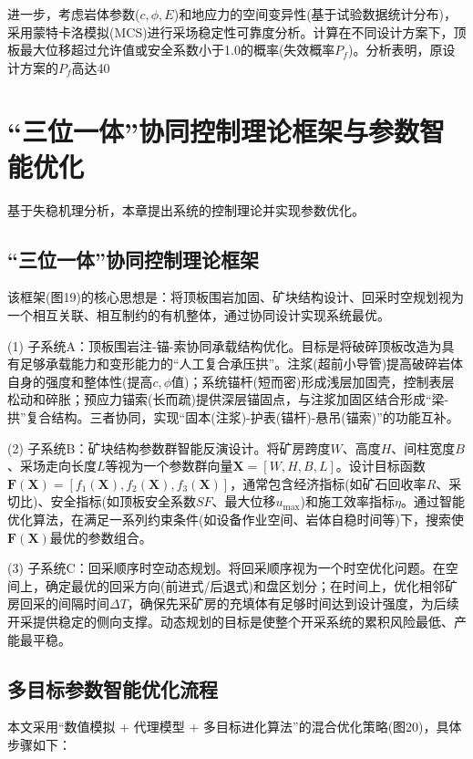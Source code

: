\documentclass[twocolumn,a4paper,10pt]{article}
\begin{document}
进一步，考虑岩体参数($c, \phi, E$)和地应力的空间变异性(基于试验数据统计分布)，采用蒙特卡洛模拟(MCS)进行采场稳定性可靠度分析。计算在不同设计方案下，顶板最大位移超过允许值或安全系数小于1.0的概率(失效概率$P_f$)。分析表明，原设计方案的$P_f$高达40%

\section{“三位一体”协同控制理论框架与参数智能优化}
基于失稳机理分析，本章提出系统的控制理论并实现参数优化。

\subsection{“三位一体”协同控制理论框架}
该框架(图19)的核心思想是：将顶板围岩加固、矿块结构设计、回采时空规划视为一个相互关联、相互制约的有机整体，通过协同设计实现系统最优。

(1) 子系统A：顶板围岩注-锚-索协同承载结构优化。目标是将破碎顶板改造为具有足够承载能力和变形能力的“人工复合承压拱”。注浆(超前小导管)提高破碎岩体自身的强度和整体性(提高$c, \phi$值)；系统锚杆(短而密)形成浅层加固壳，控制表层松动和碎胀；预应力锚索(长而疏)提供深层锚固点，与注浆加固区结合形成“梁-拱”复合结构。三者协同，实现“固本(注浆)-护表(锚杆)-悬吊(锚索)”的功能互补。

(2) 子系统B：矿块结构参数群智能反演设计。将矿房跨度$W$、高度$H$、间柱宽度$B$、采场走向长度$L$等视为一个参数群向量$\mathbf{X}=[W,H,B,L]$。设计目标函数$\mathbf{F}(\mathbf{X})=[f_1(\mathbf{X}),f_2(\mathbf{X}),f_3(\mathbf{X})]$，通常包含经济指标(如矿石回收率$R$、采切比)、安全指标(如顶板安全系数$SF$、最大位移$u_{\text{max}}$)和施工效率指标$\eta$。通过智能优化算法，在满足一系列约束条件(如设备作业空间、岩体自稳时间等)下，搜索使$\mathbf{F}(\mathbf{X})$最优的参数组合。

(3) 子系统C：回采顺序时空动态规划。将回采顺序视为一个时空优化问题。在空间上，确定最优的回采方向(前进式/后退式)和盘区划分；在时间上，优化相邻矿房回采的间隔时间$\Delta T$，确保先采矿房的充填体有足够时间达到设计强度，为后续开采提供稳定的侧向支撑。动态规划的目标是使整个开采系统的累积风险最低、产能最平稳。

\subsection{多目标参数智能优化流程}
本文采用“数值模拟 + 代理模型 + 多目标进化算法”的混合优化策略(图20)，具体步骤如下：
\end{document}
